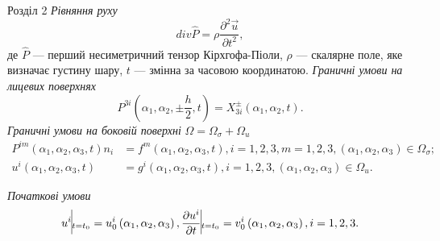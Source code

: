 \documentclass[8pt]{beamer}
\numberwithin{figure}{section}
\numberwithin{equation}{section}
\numberwithin{table}{section}
\begin{document}
\begin{frame}{Розділ 2}
\emph{Рівняння руху}\\
\vspace{1em}
\begin{equation} \label{eq:P}
div \hat{P} = \rho \frac{\partial^2 \vec{u}}{\partial t^2},
\end{equation}
де $\hat{P}$ --- перший несиметричний тензор Кірхгофа-Піоли, $\rho$ --- скалярне поле, яке визначає густину шару, $t$ --- змінна за часовою координатою.
\linebreak 
\linebreak 
\emph{Граничні умови на лицевих поверхнях}
\begin{equation}
P^{3i}\left( \alpha_1, \alpha_2, \pm \frac{h}{2}, t \right) = X^{\pm}_{3i}\left( \alpha_1, \alpha_2, t \right).
\end{equation}
\linebreak
\emph{Граничні умови на боковій поверхні} $\Omega = \Omega_{\sigma} + \Omega_{u} $
\begin{align}
P^{im}\left( \alpha_1, \alpha_2, \alpha_3, t \right)n_i &= f^{m}\left( \alpha_1, \alpha_2, \alpha_3, t \right), i=1,2,3, m=1,2,3, \left( \alpha_1, \alpha_2,\alpha_3\right)\in\Omega_{\sigma};\\
u^{i}\left( \alpha_1, \alpha_2, \alpha_3, t \right) &=g^{i}\left( \alpha_1, \alpha_2, \alpha_3, t \right), i=1,2,3, \left( \alpha_1, \alpha_2,\alpha_3\right)\in\Omega_{u}.
\end{align}

\emph{Початкові умови}
\begin{equation}
u^{i}\vline _{t=t_0} = u^i_0 \left( \alpha_1, \alpha_2, \alpha_3 \right), \frac{\partial u^{i}}{\partial t}\vline _{t=t_0} =v^i_0 \left( \alpha_1, \alpha_2, \alpha_3 \right), i=1,2,3.
\end{equation}

\end{frame}

%
%
%
\end{document}

